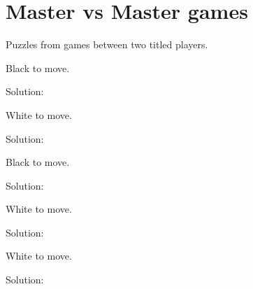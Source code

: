 \documentclass{book}
\begin{document}
\section{Master vs Master games}
Puzzles from games between two titled players.\begin{multicols}{2} 
\begin{samepage} 
\newgame 


 
\showboard
 
 Black to move. 
 
Solution: 
 
\end{samepage}\begin{samepage} 
\newgame 


 
\showboard
 
 White to move. 
 
Solution: 
 
\end{samepage}\begin{samepage} 
\newgame 


 
\showboard
 
 Black to move. 
 
Solution: 
 
\end{samepage}\begin{samepage} 
\newgame 


 
\showboard
 
 White to move. 
 
Solution: 
 
\end{samepage}\begin{samepage} 
\newgame 


 
\showboard
 
 White to move. 
 
Solution: 
 
\end{samepage}\begin{samepage} 
\newgame 


\end{samepage}
\end{multicols}
\end{document}
